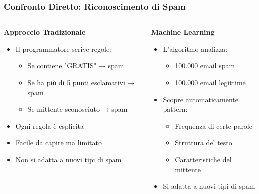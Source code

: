 \documentclass[aspectratio=169]{beamer}
\begin{document}
\begin{frame}
\frametitle{Confronto Diretto: Riconoscimento di Spam}
\begin{columns}
\begin{column}{0.48\textwidth}
\textbf{\color{red}Approccio Tradizionale}
\begin{itemize}
\item Il programmatore scrive regole:
\begin{itemize}
\item Se contiene "GRATIS" → spam
\item Se ha più di 5 punti esclamativi → spam
\item Se mittente sconosciuto → spam
\end{itemize}
\item Ogni regola è esplicita
\item Facile da capire ma limitato
\item Non si adatta a nuovi tipi di spam
\end{itemize}
\end{column}
\begin{column}{0.48\textwidth}
\textbf{\color{aiblue}Machine Learning}
\begin{itemize}
\item L'algoritmo analizza:
\begin{itemize}
\item 100.000 email spam
\item 100.000 email legittime
\end{itemize}
\item Scopre automaticamente pattern:
\begin{itemize}
\item Frequenza di certe parole
\item Struttura del testo
\item Caratteristiche del mittente
\end{itemize}
\item Si adatta a nuovi tipi di spam
\end{itemize}
\end{column}
\end{columns}
\end{frame}
%
\end{document}
